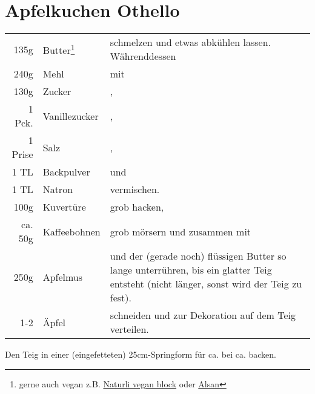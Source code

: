 \section{Apfelkuchen Othello}
\begin{longtable}{rlL{16.9cm}}
	135g	&	Butter\footnote{gerne auch vegan z.B. \href{https://www.bio123.de/produkt/naturli/naturli-organic-vegan-block-200g}{Naturli vegan block}
									oder \href{https://www.alsan.de/alsan-bio/}{Alsan}}
								&	schmelzen und etwas abkühlen lassen.
									Währenddessen	\\
	240g	&	Mehl			&	mit	\\
	130g	&	Zucker			&	,	\\
	1 Pck.	&	Vanillezucker	&	,	\\
	1 Prise	&	Salz			&	,	\\
	1 TL	&	Backpulver		&	und	\\
	1 TL	&	Natron			&	vermischen.	\\
	100g	&	Kuvertüre		&	grob hacken,	\\
	ca. 50g	&	Kaffeebohnen	&	grob mörsern und zusammen mit	\\
	250g	&	Apfelmus		&	und der (gerade noch) flüssigen Butter so lange unterrühren, bis ein glatter Teig entsteht (nicht länger, sonst wird der Teig zu fest).	\\
	1-2		&	Äpfel			&	schneiden und zur Dekoration auf dem Teig verteilen.\\
\end{longtable}

Den Teig in einer (eingefetteten) 25cm-Springform für ca.  bei ca.  backen.